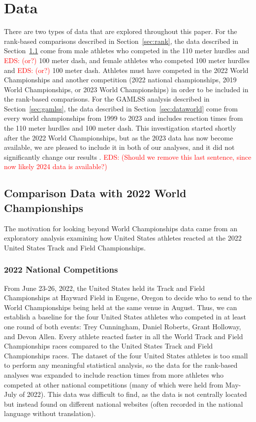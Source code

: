 \documentclass[12pt, letterpaper]{article}
\newcommand{\eds}[1]{\textcolor{red}{EDS: (#1)}}
\begin{document}
\section{Data} \label{sec:Data}

There are two types of data that are explored throughout this paper. For the
rank-based comparisons described in Section~\ref{sec:rank}, the data described in 
Section~\ref{sec:databeyond} come from male 
athletes who competed in the 110 meter hurdles and \eds{or?} 100 meter dash, and 
female athletes who competed 100 meter hurdles and \eds{or?} 100 meter dash.
Athletes must have competed in the 2022 World Championships and another competition 
(2022 national championships, 2019 World Championships, or 2023 World Championships) 
in order to be included in the rank-based comparisons. 
For the GAMLSS analysis described in Section~\ref{sec:gamlss}, the data described 
in Section~\ref{sec:dataworld} come
from every world championships from 1999 to 2023 and includes reaction times from
the 110 meter hurdles and 100 meter dash. This investigation started 
shortly after the 2022 World Championships, but as the 2023 data has now become 
available, we are pleased to include it in both of our analyses, and it did not
significantly change our results \citep{WAData}. \eds{Should we remove this 
last sentence, since now likely 2024 data is available?}


\subsection{Comparison Data with 2022 World Championships}
\label{sec:databeyond}

The motivation for looking beyond World Championships data came from an 
exploratory analysis examining how United States athletes reacted at the 
2022 United States Track and Field Championships.


\subsubsection{2022 National Competitions}\label{sec:datanational}
From June 23-26, 2022, the United States held its Track and Field Championships 
at Hayward Field in Eugene, Oregon to decide who to send to the World 
Championships being held at the same venue in August. Thus, we can establish a 
baseline for the four United States athletes who competed in at least one round 
of both events: Trey Cunningham, Daniel Roberts, Grant Holloway, and Devon Allen.  
Every athlete reacted faster in all the World Track and Field Championships 
races compared to the United States Track and Field Championships races. The 
dataset of the four United States athletes is too small to perform any 
meaningful statistical analysis, so the data for the rank-based analyses was 
expanded to include reaction 
times from more athletes who competed at other national competitions (many of which were 
held from May-July of 2022). This data was difficult to find, as the data is not
centrally located but instead found on different national websites (often 
recorded in the national language without translation).
\end{document}
